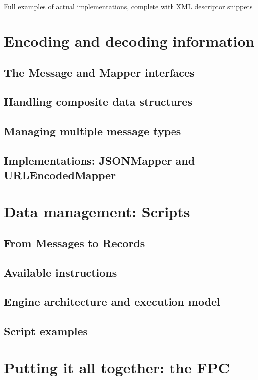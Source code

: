 Full examples of actual implementations, complete with XML descriptor snippets


\section{Encoding and decoding information}

\subsection{The Message and Mapper interfaces}

\subsection{Handling composite data structures}

\subsection{Managing multiple message types}

\subsection{Implementations: JSONMapper and URLEncodedMapper}


\section{Data management: Scripts}

\subsection{From Messages to Records}

\subsection{Available instructions}

\subsection{Engine architecture and execution model}

\subsection{Script examples}


\section{Putting it all together: the FPC}

